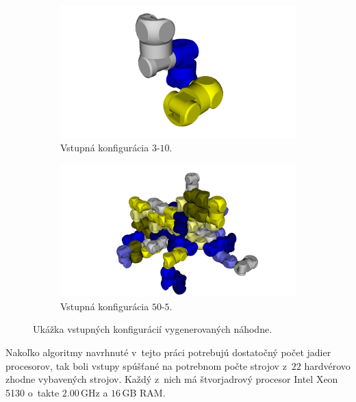 \documentclass[
  printed, %
  oneside, %
  notable,   %
  nolof,     %
  nolot,     %
]{fithesis3}
\begin{document}
\begin{figure}[hbt!]
    \centering
    \begin{subfigure}[b]{0.47\textwidth}
        \includegraphics[width=\textwidth]{pictures/3-10-init.png}
        \caption[3-10-init]{Vstupná konfigurácia $3$-$10$.}
        \label{fig:3-10-init}
    \end{subfigure}
    \begin{subfigure}[b]{0.47\textwidth}
        \includegraphics[width=\textwidth]{pictures/50-5-init.png}
        \caption[50-5-init]{Vstupná konfigurácia $50$-$5$.}
    \end{subfigure}
    \caption[Ukážkové vstupné konfigurácie]{Ukážka vstupných konfigurácií vygenerovaných náhodne. }
    \label{fig:rofibotExamples}
\end{figure}

\newcommand{\comment}[1]{}
\comment{
Okrem náhodne generovaných vstupov boli skúšané aj ručne vytvorené vstupy, kde nie je nutne zaručená existencia rekonfigurácie. Niektoré príklady vizualizuje obrázok \ref{fig:rotationExampleByHand}. }

Nakoľko algoritmy navrhnuté v~tejto práci potrebujú dostatočný počet jadier procesorov, tak boli vstupy spúšťané na potrebnom počte strojov z~$22$ hardvérovo zhodne vybavených strojov. Každý z~nich má štvorjadrový procesor Intel Xeon 5130 o~takte $2.00$\,GHz a $16$\,GB RAM. 
\end{document}
